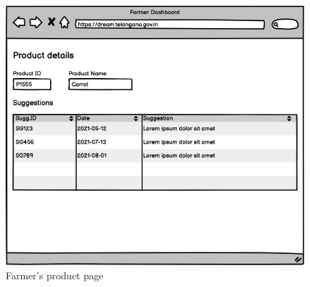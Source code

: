 \documentclass[10pt]{article} %
\begin{document}
\begin{figure}[h!]
    \centering
    \centerline{\includegraphics[scale=0.54]{images/uimockups/f_product.png}}
    \caption{Farmer's product page}
    \label{fig:ui_f_product}
\end{figure}
\newpage
\end{document}

